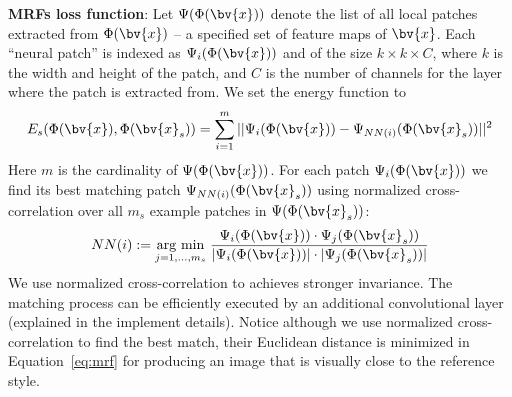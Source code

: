 \documentclass[10pt,twocolumn,letterpaper]{article}
\newcommand{\argmin}[1]{\underset{#1}{\operatorname{arg}\,\operatorname{min}}\;}
\begin{document}
%
%
%

\textbf{MRFs loss function}: Let $\Psi(\Phi(\bv{x}))$ denote the list of all local patches extracted from $\Phi(\bv{x})$ -- a specified set of feature maps of $\bv{x}$. Each ``neural patch'' is indexed as $\Psi_i( \Phi(\bv{x}) )$ and of the size $k \times k \times C$, where $k$ is the width and height of the patch, and $C$ is the number of channels for the layer where the patch is extracted from.
We set the energy function to
%
\begin{equation}
E_{s}(\Phi(\bv{x}), \Phi(\bv{x}_{s})) = \sum_{i = 1}^{m}||\Psi_i(\Phi(\bv{x})) - \Psi_{NN(i)}(\Phi(\bv{x}_{s}))||^{2}
\label{eq:mrf}
\end{equation}
%
Here $m$ is the cardinality of $\Psi(\Phi(\bv{x}))$.
For each patch $\Psi_i(\Phi(\bv{x}))$ we find its best matching patch $\Psi_{NN(i)}(\Phi(\bv{x}_{s}))$ using normalized cross-correlation over all $m_s$ example patches in $\Psi(\Phi(\bv{x}_{s}))$: 
\begin{equation}
NN(i) := \argmin{j=1,...,m_s}\frac{\Psi_i(\Phi(\bv{x}))\cdot\Psi_j(\Phi(\bv{x}_{s}))}{|\Psi_i(\Phi(\bv{x}))|\cdot|\Psi_j(\Phi(\bv{x}_{s}))|}
\label{eq:ncorr}
\end{equation}
%
We use normalized cross-correlation to achieves stronger invariance. The matching process can be efficiently executed by an additional convolutional layer (explained in the implement details). Notice although we use normalized cross-correlation to find the best match, their Euclidean distance is minimized in Equation~\ref{eq:mrf} for producing an image that is visually close to the reference style.  
\end{document}
